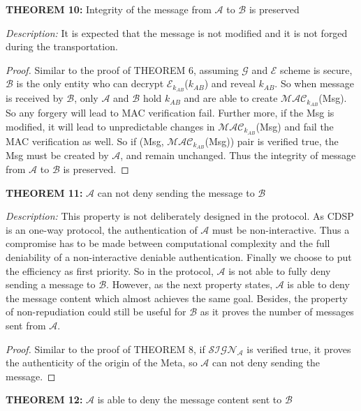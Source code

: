 \vspace{1cm}
\noindent
\textbf{THEOREM 10:} Integrity of the message from $\mathcal{A}$ to $\mathcal{B}$ is preserved

\bigskip
\noindent
\textit{Description: }It is expected that the message is not modified and it is not forged during the transportation.
\begin{proof}
Similar to the proof of THEOREM 6, assuming $\mathcal{G}$ and $\mathcal{E}$ scheme is secure, $\mathcal{B}$ is the only entity who can decrypt $\mathcal{E}_{k_{AB}}$($k_{AB}$) and reveal $k_{AB}$. So when message is received by $\mathcal{B}$, only $\mathcal{A}$ and $\mathcal{B}$ hold $k_{AB}$ and are able to create $\mathcal{MAC}_{k_{AB}}$(Msg). So any forgery will lead to MAC verification fail. Further more, if the Msg is modified, it will lead to unpredictable changes in $\mathcal{MAC}_{k_{AB}}$(Msg) and fail the MAC verification as well. So if (Msg, $\mathcal{MAC}_{k_{AB}}$(Msg)) pair is verified true, the Msg must be created by $\mathcal{A}$, and remain unchanged. Thus the integrity of message from $\mathcal{A}$ to $\mathcal{B}$ is preserved.
\end{proof}

\vspace{1cm}
\noindent
\textbf{THEOREM 11:} $\mathcal{A}$ can not deny sending the message to $\mathcal{B}$

\bigskip
\noindent
\textit{Description: }This property is not deliberately designed in the protocol. As CDSP is an one-way protocol, the authentication of $ \mathcal{A} $ must be non-interactive. Thus a compromise has to be made between computational complexity and the full deniability of a non-interactive deniable authentication. Finally we choose to put the efficiency as first priority. So in the protocol, $ \mathcal{A} $ is not able to fully deny sending a message to $ \mathcal{B} $. However, as the next property states, $ \mathcal{A} $ is able to deny the message content which almost achieves the same goal. Besides, the property of non-repudiation could still be useful for $ \mathcal{B} $ as it proves the number of messages sent from $ \mathcal{A} $.

\bigskip
\begin{proof}
Similar to the proof of THEOREM 8, if $\mathcal{SIGN_A}$ is verified true, it proves the authenticity of the origin of the Meta, so $\mathcal{A}$ can not deny sending the message.
\end{proof}

\vspace{1cm}
\noindent
\textbf{THEOREM 12:} $\mathcal{A}$ is able to deny the message content sent to $\mathcal{B}$

